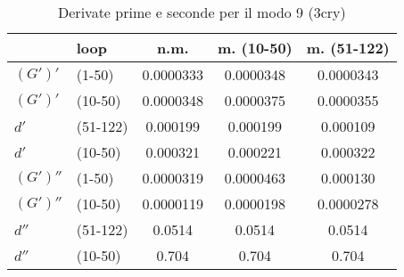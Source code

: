 \begin{appendices}
\vspace{-0.5cm}

\begin{table}[H]
	\caption{Derivate prime e seconde per il modo 9 (3cry)}
	\vspace{-0.5cm}
	\label{tb:modo_9}
	\begin{center}
		\begin{tabular}{llccc}
			\toprule
			& loop & n.m.  & m. (10-50) & m. (51-122)  \\			
			\midrule
			$(G')' $ & (1-50) & 0.0000333 & 0.0000348 & 0.0000343 \\
			$(G')' $ & (10-50) & 0.0000348 & 0.0000375 & 0.0000355 \\
			$ d' $ & (51-122) & 0.000199 & 0.000199 & 0.000109 \\
			$ d' $ & (10-50) & 0.000321 & 0.000221 & 0.000322 \\
			$(G')'' $ & (1-50) & 0.0000319 & 0.0000463 & 0.000130 \\
			$(G')'' $ & (10-50)  & 0.0000119 & 0.0000198 & 0.0000278 \\
			$ d'' $ & (51-122) & 0.0514 & 0.0514 & 0.0514 \\
			$ d'' $ & (10-50) & 0.704 & 0.704 & 0.704 \\
			\bottomrule
		\end{tabular}
	\end{center}
\end{table}
\clearpage

















\end{appendices}
